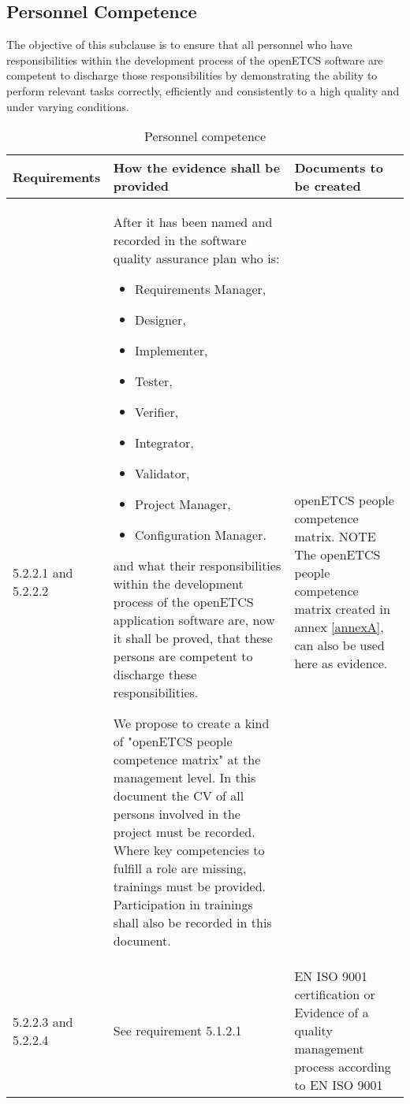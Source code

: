 \documentclass{template/openetcs_report}
\begin{document}
\subsection{Personnel Competence}
\begin{flushleft}
The objective of this subclause is to ensure that all personnel who have responsibilities within the development process of the openETCS software are competent to discharge those responsibilities by demonstrating the ability to perform relevant tasks correctly, efficiently and consistently to a high quality and under varying conditions.
\end{flushleft}
{\footnotesize\sffamily\centering
\begin{longtable}{|p{2cm}|p{9cm}|p{3cm}|}
\caption{Personnel competence}\\
\hline
\bfseries Requirements & \bfseries How the evidence shall be provided & \bfseries Documents to be created\\
\hline
\hline
\endhead
\hline
\endfoot

5.2.2.1 and 5.2.2.2 & After it has been named and recorded in the software quality assurance plan who is:
\begin{itemize}\itemsep=0pt
  \item Requirements Manager,
  \item Designer,
  \item Implementer,
  \item Tester,
  \item Verifier,
  \item Integrator,
  \item Validator,
  \item Project Manager,
  \item Configuration Manager.
\end{itemize}
and what their responsibilities within the development process of the openETCS application software are, now it shall be proved, that these persons are competent to discharge these responsibilities.

We propose to create a kind of "openETCS people competence matrix" at the management level. In this document the CV of all persons involved in the project must be recorded.
Where key competencies to fulfill a role are missing, trainings must be provided.
Participation in trainings shall also be recorded in this document.
& openETCS people competence matrix.
\linebreak
\linebreak
NOTE\linebreak
The openETCS people competence matrix created in annex \ref{annexA}, can also be used here as evidence.\\ 
\hline
5.2.2.3 and 5.2.2.4 & See requirement 5.1.2.1 & EN ISO 9001 certification or Evidence of a quality management process according to EN ISO 9001\\ 
\hline
\end{longtable}}
\end{document}
